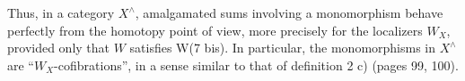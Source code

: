 Thus, in a category $X^\wedge$, amalgamated sums involving a monomorphism behave perfectly from the homotopy point of view, more precisely for the localizers $W_X$, provided  only that $W$ satisfies W(7 bis). In particular, the monomorphisms in $X^\wedge$ are ``$W_X$-cofibrations'', in a sense similar to that of definition 2 c) (pages 99, 100).


